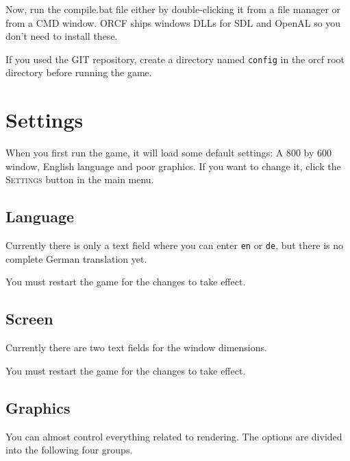 \documentclass[a4paper]{article}
\newcommand{\cfile}[1]{\texttt{#1}}
\newcommand{\ccaption}[1]{\textsc{#1}}
\newcommand{\cvalue}[1]{\texttt{#1}}
\begin{document}
Now, run the compile.bat file either by double-clicking it from a file manager or from a CMD window. ORCF ships windows DLLs for SDL and
OpenAL so you don't need to install these.

If you used the GIT repository, create a directory named \cfile{config} in the orcf root directory before running the game.

\section{Settings}

When you first run the game, it will load some default settings: A 800 by 600 window, English language and poor graphics. If you want to
change it, click the \ccaption{Settings} button in the main menu.

\subsection{Language}
Currently there is only a text field where you can enter \cvalue{en} or \cvalue{de}, but there is no complete German translation yet.

You must restart the game for the changes to take effect.

\subsection{Screen}
Currently there are two text fields for the window dimensions.

You must restart the game for the changes to take effect.

\subsection{Graphics}

You can almost control everything related to rendering. The options are divided into the following four groups.
\end{document}
